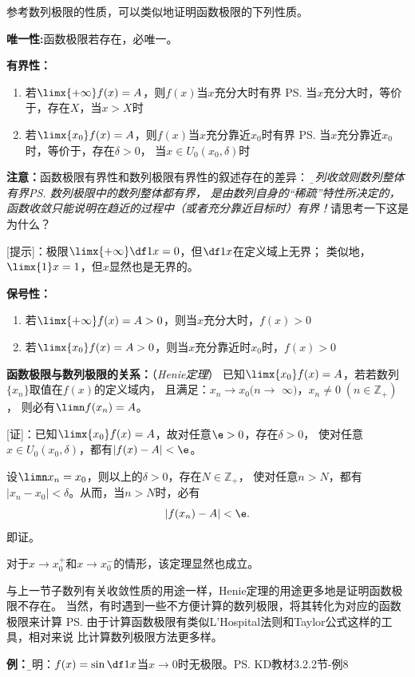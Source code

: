 参考数列极限的性质，可以类似地证明函数极限的下列性质。

{\bf 唯一性:}函数极限若存在，必唯一。

{\bf 有界性：}
\begin{enumerate}[(1)]
  \setlength{\itemindent}{1cm}
  \item 若$\limx{+\infty}f(x)=A$，则$f(x)$当$x$充分大时有界
  \ps{当$x$充分大时，等价于，存在$X$，当$x>X$时}
  \item 若$\limx{x_0}f(x)=A$，则$f(x)$当$x$充分靠近$x_0$时有界
  \ps{当$x$充分靠近$x_0$时，等价于，存在$\delta>0$，
  当$x\in U_0(x_0,\delta)$时}
\end{enumerate}

{\bf 注意：}函数极限有界性和数列极限有界性的叙述存在的差异：
{\it\b 数列收敛则数列整体有界\ps{数列极限中的数列整体都有界，
是由数列自身的“稀疏”特性所决定的}，
函数收敛只能说明在趋近的过程中（或者充分靠近目标时）有界！}请思考一下这是为什么？

[提示]：极限$\limx{+\infty}\df1x=0$，但$\df1x$在定义域上无界；
类似地，$\limx{1}x=1$，但$x$显然也是无界的。

{\bf 保号性：}
\begin{enumerate}[(1)]
  \setlength{\itemindent}{1cm}
  \item 若$\limx{+\infty}f(x)=A>0$，则当$x$充分大时，$f(x)>0$
  \item 若$\limx{x_0}f(x)=A>0$，则当$x$充分靠近时$x_0$时，$f(x)>0$
\end{enumerate}

{\bf 函数极限与数列极限的关系：}（{\it Henie定理}）
已知$\limx{x_0}f(x)=A$，若若数列$\{x_n\}$取值在$f(x)$的定义域内，
且满足：$x_n\to x_0(n\to$ $\infty)$，$x_n\ne 0\;(n\in\mathbb{Z}_+)$，
则必有$\limn f(x_n)=A$。

[证]：已知$\limx{x_0}f(x)=A$，故对任意$\e>0$，存在$\delta>0$，
使对任意$x\in U_0(x_0,\delta)$，都有$|f(x)-A|<\e$。

设$\limn x_n=x_0$，则以上的$\delta>0$，存在$N\in\mathbb{Z}_+$，
使对任意$n>N$，都有$|x_n-x_0|<\delta$。从而，当$n>N$时，必有
$$|f(x_n)-A|<\e.$$
即证。

对于$x\to x_0^+$和$x\to x_0^-$的情形，该定理显然也成立。

与上一节子数列有关收敛性质的用途一样，Henie定理的用途更多地是证明函数极限不存在。
当然，有时遇到一些不方便计算的数列极限，将其转化为对应的函数极限来计算
\ps{由于计算函数极限有类似L'Hospital法则和Taylor公式这样的工具，相对来说
比计算数列极限方法更多样}。

{\bf 例：}{\b 证明：$f(x)=\sin\df 1x$当$x\to 0$时无极限。}\ps{KD教材3.2.2节-例8}

